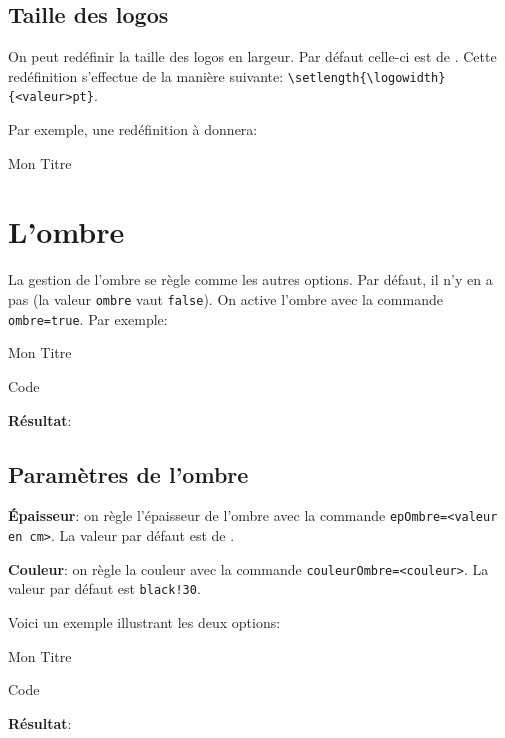 \documentclass[a4paper,10pt,frenchb]{article}
\newenvironment*{demo}{%
\VerbatimOut{toto.txt}%
}%
{%
\endVerbatimOut%
\begin{bclogo}[margeG=1,logo=\bccrayon,couleurBarre=Gray,barre=wave,noborder]{Code}%
\begin{footnotesize}%
%
\end{footnotesize}%
\end{bclogo}%
\noindent\textbf{Résultat}:\par\smallskip
%
}%
\newcommand*\cmd{\color{Maroon}}%
\begin{document}
\subsection{Taille des logos}

On peut redéfinir la taille des logos en largeur. Par défaut celle-ci est de
. Cette redéfinition s'effectue de la manière
suivante: {\cmd\verb|\setlength{\logowidth}{<valeur>pt}|}.

Par exemple, une redéfinition à  donnera:

\setlength{\logowidth}{10pt}
\begin{bclogo}[couleur=blue!30,arrondi=0.1]{Mon Titre}
  \lipsum[2]
\end{bclogo}
\setlength{\logowidth}{17pt}

\section{L'ombre}

La gestion de l'ombre se règle comme les autres options. Par défaut, il n'y en
a pas (la valeur \texttt{ombre} vaut \texttt{false}). On active l'ombre avec la
commande {\cmd\verb|ombre=true|}. Par exemple:

\begin{demo}
\begin{bclogo}[couleur=blue!30,arrondi=0.1,ombre=true]{Mon Titre}
  \lipsum[2]
\end{bclogo}
\end{demo}

\subsection{Paramètres de l'ombre}

\noindent\textbf{Épaisseur}: on règle l'épaisseur de l'ombre avec la
commande {\cmd\verb|epOmbre=<valeur en cm>|}. La valeur par défaut est
de .

\noindent\textbf{Couleur}: on règle la couleur avec la commande
{\cmd\verb|couleurOmbre=<couleur>|}. La valeur par défaut est
\texttt{black!30}.

Voici un exemple illustrant les deux options:

\begin{demo}
\begin{bclogo}[couleur=blue!30,arrondi=0.1,ombre=true,epOmbre=0.25,
  couleurOmbre=black!30]{Mon Titre}
  \lipsum[3]
\end{bclogo}
\end{demo}
\end{document}
